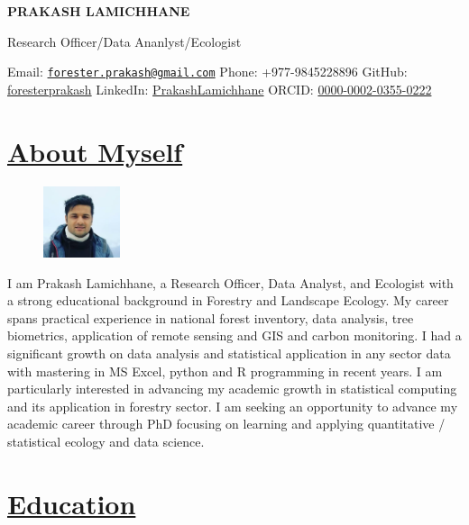 \documentclass[
]{article}
\author{}
\date{\vspace{-2.5em}}
\begin{document}
\begin{centering}

\Large

{\bf PRAKASH LAMICHHANE}

\normalsize
Research Officer/Data Ananlyst/Ecologist

\end{centering}

\normalsize

Email:
\href{mailto:forester.prakash@gmail.com}{\nolinkurl{forester.prakash@gmail.com}}
\textbar{} Phone: +977-9845228896 \textbar{} GitHub:
\href{https://github.com/foresterprakash}{foresterprakash} \textbar{}
LinkedIn:
\href{https://www.linkedin.com/in/PrakashLamichhane}{PrakashLamichhane}
\textbar{} ORCID:
\href{https://orcid.org/0000-0002-0355-0222}{0000-0002-0355-0222}

\section{\texorpdfstring{\underline{About Myself}}{}}\label{section}

\begin{figure}
    \includegraphics[width=0.2\textwidth]{Photo_Prakash.jpg}
\end{figure}

I am Prakash Lamichhane, a Research Officer, Data Analyst, and Ecologist
with a strong educational background in Forestry and Landscape Ecology.
My career spans practical experience in national forest inventory, data
analysis, tree biometrics, application of remote sensing and GIS and
carbon monitoring. I had a significant growth on data analysis and
statistical application in any sector data with mastering in MS Excel,
python and R programming in recent years. I am particularly interested
in advancing my academic growth in statistical computing and its
application in forestry sector. I am seeking an opportunity to advance
my academic career through PhD focusing on learning and applying
quantitative / statistical ecology and data science.

\section{\texorpdfstring{\underline{Education}}{}}\label{section-1}
\end{document}

